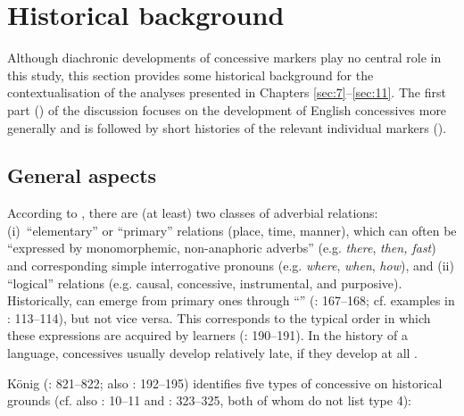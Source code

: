 \section{\label{bkm:Ref82082809}\label{bkm:Ref427224630}Historical background}\label{sec:2.1}

Although diachronic developments of concessive markers play no central role in this study, this section provides some historical background for the contextualisation of the analyses presented in Chapters \ref{sec:7}–\ref{sec:11}. The first part () of the discussion focuses on the development of English concessives more generally and is followed by short histories of the relevant individual markers ().

\subsection{\label{bkm:Ref467055763}General aspects}\label{sec:2.1.1}

According to \citet[190]{König1991a}, there are (at least) two classes of adverbial relations:
(i)~“elementary” or “primary” relations (place, time, manner), which can often be “expressed by monomorphemic, non-anaphoric adverbs” (e.g. \textit{there}, \textit{then, fast}) and corre\-sponding simple interrogative pronouns (e.g. \textit{where}, \textit{when}, \textit{how}), and
(ii) “logical” rela\-tions (e.g. causal, concessive, instrumental, and purposive). Historically,  can emerge from primary ones through “” (\citealt{Hilpert2013a}: 167–168; cf. examples in \citealt{KönigTraugott1988}: 113–114), but not vice versa. This corre\-sponds to the typical order in which these expressions are acquired by learners (\citealt{König1991a}: 190–191). In the history of a language, concessives usually develop relatively late, if they develop at all \parencites[1--2]{König1985}[151]{König1988}[632]{König1991b}[319]{Kortmann1996}[821]{König2006}[167--168]{Hilpert2013a}.

König (\citeyear{König2006}: 821–822; also \citealt{König1991a}: 192–195) identifies five types of concessive  on historical grounds (cf. also \citealt{König1985}: 10–11 and \citealt{KönigEisenberg1984}: 323–325, both of whom do not list type 4):

